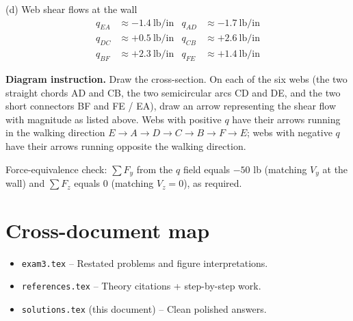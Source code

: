 \documentclass[11pt]{article}
\begin{document}
\begin{answerbox}{(d) Web shear flows at the wall}
\[
\begin{aligned}
q_{EA} &\approx -1.4\ \text{lb/in} & q_{AD} &\approx -1.7\ \text{lb/in}\\
q_{DC} &\approx +0.5\ \text{lb/in} & q_{CB} &\approx +2.6\ \text{lb/in}\\
q_{BF} &\approx +2.3\ \text{lb/in} & q_{FE} &\approx +1.4\ \text{lb/in}
\end{aligned}
\]

\textbf{Diagram instruction.} Draw the cross-section. On each of the six webs (the two straight chords AD and CB, the two semicircular arcs CD and DE, and the two short connectors BF and FE / EA), draw an arrow representing the shear flow with magnitude as listed above. Webs with positive $q$ have their arrows running in the walking direction $E \to A \to D \to C \to B \to F \to E$; webs with negative $q$ have their arrows running opposite the walking direction.

Force-equivalence check: $\sum F_y$ from the $q$ field equals $-50$ lb (matching $V_y$ at the wall) and $\sum F_z$ equals $0$ (matching $V_z = 0$), as required.
\end{answerbox}

\section*{Cross-document map}

\begin{itemize}[leftmargin=2em, itemsep=1pt]
  \item \texttt{exam3.tex} -- Restated problems and figure interpretations.
  \item \texttt{references.tex} -- Theory citations + step-by-step work.
  \item \texttt{solutions.tex} (this document) -- Clean polished answers.
\end{itemize}
\end{document}
